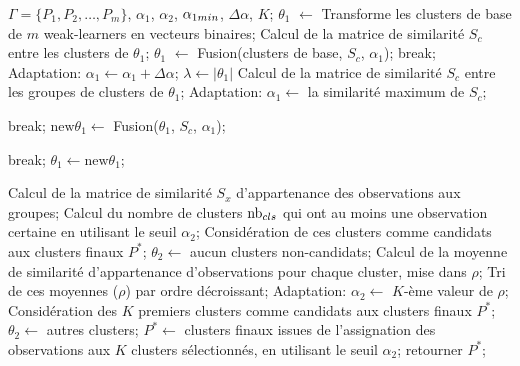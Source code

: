 \documentclass[12pt, french, latin.medieval, a4paper]{report}
\begin{document}
	\begin{algorithm}[H]
    	\caption{Algorithme ACE \cite{alqurashi2019clustering}}
    	\label{alg:ace}
    	\begin{algorithmic}[1]
    	\REQUIRE $\Gamma = \{ P_1, P_2, \dots, P_m \}$, $\alpha_1$, $\alpha_2$, $\alpha_{1\small{min}}$, $\Delta\alpha$, $K$;
    	\STATE $\theta_1$ $\leftarrow$ Transforme les clusters de base de $m$ weak-learners en vecteurs binaires;
    	\STATE Calcul de la matrice de similarité $S_c$ entre les clusters de $\theta_1$;
        	\STATE $\theta_1$ $\leftarrow$ Fusion(clusters de base, $S_c$, $\alpha_1$);
            	\STATE break;
        	\ELSE
            	\STATE Adaptation: $\alpha_1 \leftarrow \alpha_1 + \Delta\alpha$;
        	\ENDIF
    	\ENDWHILE
    	\STATE $\lambda \leftarrow |\theta_1|$
        	\STATE Calcul de la matrice de similarité $S_c$ entre les groupes de clusters de $\theta_1$;
        	\STATE Adaptation: $\alpha_1 \leftarrow$ la similarité maximum de $S_c$;
        	 
            	\STATE break;
        	\ELSE
            	\STATE $\text{new}\theta_1 \leftarrow$ Fusion($\theta_1$, $S_c$, $\alpha_1$);
        	\ENDIF

            	\STATE break;
        	\ELSE
            	\STATE $ \theta_1 \leftarrow \text{new}\theta_1$;
        	\ENDIF
    	\ENDWHILE

    	\STATE Calcul de la matrice de similarité $S_x$ d'appartenance des observations aux groupes;
    	\STATE Calcul du nombre de clusters $\text{nb}_{\small{cls}}$ qui ont au moins une observation certaine en utilisant le seuil $\alpha_2$;
        	\STATE Considération de ces clusters comme candidats aux clusters finaux $P^*$;
        	\STATE $ \theta_2 \leftarrow$ aucun clusters non-candidats;
    	\ELSE
        	\STATE Calcul de la moyenne de similarité d'appartenance d'observations pour chaque cluster, mise dans $\rho$;
        	\STATE Tri de ces moyennes ($\rho$) par ordre décroissant;
        	\STATE Adaptation: $\alpha_2 \leftarrow $ $K$-ème valeur de $\rho$;
        	\STATE Considération des $K$ premiers clusters comme candidats aux clusters finaux $P^*$;
        	\STATE $\theta_2 \leftarrow$ autres clusters;
    	\ENDIF
    	\STATE $P^* \leftarrow$ clusters finaux issues de l'assignation des observations aux $K$ clusters sélectionnés, en utilisant le seuil $\alpha_2$;
    	\STATE retourner $P^*$;
    	\end{algorithmic}
	\end{algorithm}
\end{document}
